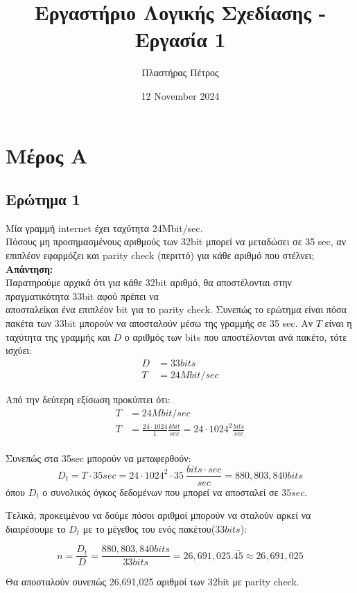 \documentclass[draft]{article}
\author{Πλαστήρας Πέτρος}
\date{12 November 2024}
\title{Εργαστήριο Λογικής Σχεδίασης - Εργασία 1}
\begin{document}
\maketitle

\section{Μέρος Α}
\subsection{Ερώτημα 1}
Μία γραμμή internet έχει ταχύτητα 24Mbit/sec.\\
Πόσους μη προσημασμένους αριθμούς των 32bit μπορεί να μεταδώσει σε 35 sec, 
αν επιπλέον εφαρμόζει και parity check (περιττό) για κάθε αριθμό που στέλνει;\\
\textbf{Απάντηση: }\\
Παρατηρούμε αρχικά ότι για κάθε 32bit αριθμό, θα αποστέλονται στην πραγματικότητα 33bit αφού πρέπει να \\
αποσταλείκαι ένα επιπλέον bit για το parity check. Συνεπώς το ερώτημα είναι πόσα πακέτα των 33bit μπορούν να αποσταλούν μέσω της γραμμής σε 35 sec.
Αν $T$ είναι η ταχύτητα της γραμμής και $D$ ο αριθμός των bits που αποστέλονται ανά πακέτο, τότε ισχύει:
\begin{align*}
  D &= 33bits \\
  T &= 24Mbit/sec
\end{align*}

Από την δεύτερη εξίσωση προκύπτει ότι:
\begin{align*}
  T &= 24Mbit/sec \\
  T &= \frac{24 \cdot 1024}{1} \frac{kbit}{sec} = 24 \cdot 1024^2 \frac{bits}{sec}\\
\end{align*}

Συνεπώς στα 35sec μπορούν να μεταφερθούν:
$$
D_t = T \cdot 35sec = 24 \cdot 1024^2 \cdot 35 \ \frac{bits \cdot sec}{sec} = 880,803,840 bits
$$
όπου $D_t$ ο συνολικός όγκος δεδομένων που μπορεί να αποσταλεί σε $35sec$. 

Τελικά, προκειμένου να δούμε πόσοι αριθμοί μπορούν να σταλούν αρκεί να 
διαιρέσουμε το $D_t$ με το μέγεθος του ενός πακέτου($33bits$):

$$
n = \frac{D_t}{D} = \frac{880,803,840 bits}{33 bits} = 26,691,025.\bar{45} \approx 26,691,025
$$

Θα αποσταλούν συνεπώς 26,691,025 αριθμοί των 32bit με parity check.
\end{document}

